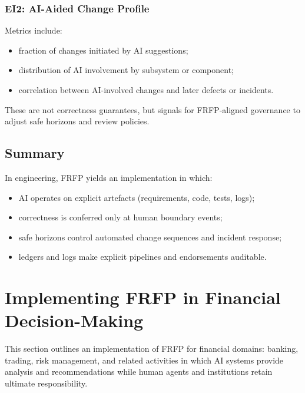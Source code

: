 \subsubsection*{EI2: AI-Aided Change Profile}

Metrics include:

\begin{itemize}
  \item fraction of changes initiated by AI suggestions;
  \item distribution of AI involvement by subsystem or component;
  \item correlation between AI-involved changes and later defects or incidents.
\end{itemize}

These are not correctness guarantees, but signals for FRFP-aligned governance
to adjust safe horizons and review policies.

\subsection{Summary}

In engineering, FRFP yields an implementation in which:

\begin{itemize}
  \item AI operates on explicit artefacts (requirements, code, tests, logs);
  \item correctness is conferred only at human boundary events;
  \item safe horizons control automated change sequences and incident response;
  \item ledgers and logs make explicit pipelines and endorsements auditable.
\end{itemize}


\section{Implementing FRFP in Financial Decision-Making}
\label{sec:frfp-finance}

This section outlines an implementation of FRFP for financial domains:
banking, trading, risk management, and related activities in which AI
systems provide analysis and recommendations while human agents and
institutions retain ultimate responsibility.

